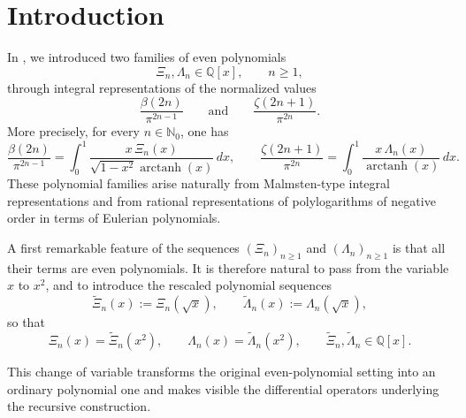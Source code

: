 \documentclass[11pt,twoside]{article}
\numberwithin{equation}{section}
\begin{document}
\vspace{0.5cm}

\section*{Introduction}

In \cite{TallaWaffo2026arxiv2602.16761}, we introduced two families of even polynomials
\[
\Xi_n,\Lambda_n\in\mathbb{Q}[x],
\qquad n\ge 1,
\]
through integral representations of the normalized values
\[
\frac{\beta(2n)}{\pi^{2n-1}}
\qquad\text{and}\qquad
\frac{\zeta(2n+1)}{\pi^{2n}}.
\]
More precisely, for every \(n\in\mathbb{N}_0\), one has
\[
\frac{\beta(2n)}{\pi^{2n-1}}
=
\int_0^1 \frac{x\,\Xi_n(x)}{\sqrt{1-x^2}\operatorname{arctanh}(x)}\,dx,
\qquad
\frac{\zeta(2n+1)}{\pi^{2n}}
=
\int_0^1 \frac{x\,\Lambda_n(x)}{\operatorname{arctanh}(x)}\,dx.
\]
These polynomial families arise naturally from Malmsten-type integral representations and from rational representations of polylogarithms of negative order in terms of Eulerian polynomials.

\vspace{0.2cm}

A first remarkable feature of the sequences \((\Xi_n)_{n\ge 1}\) and \((\Lambda_n)_{n\ge 1}\) is that all their terms are even polynomials. It is therefore natural to pass from the variable \(x\) to \(x^2\), and to introduce the rescaled polynomial sequences
\[
\widetilde{\Xi}_n(x):=\Xi_n(\sqrt{x}),
\qquad
\widetilde{\Lambda}_n(x):=\Lambda_n(\sqrt{x}),
\]
so that
\[
\Xi_n(x)=\widetilde{\Xi}_n(x^2),
\qquad
\Lambda_n(x)=\widetilde{\Lambda}_n(x^2),
\qquad
\widetilde{\Xi}_n,\widetilde{\Lambda}_n\in\mathbb{Q}[x].
\]

\vspace{0.2cm}

This change of variable transforms the original even-polynomial setting into an ordinary polynomial one and makes visible the differential operators underlying the recursive construction.

\vspace{0.2cm}
\end{document}
